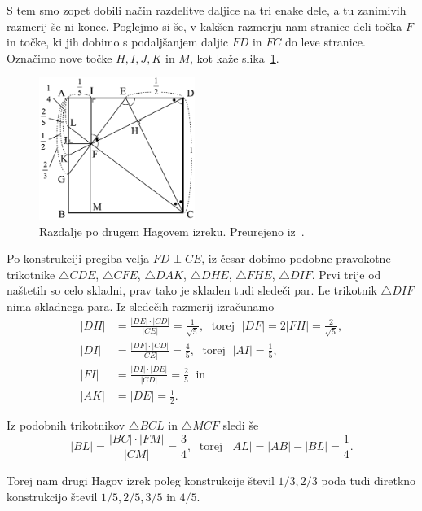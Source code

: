 S tem smo zopet dobili način razdelitve daljice na tri enake dele, a tu zanimivih razmerij še ni konec. Poglejmo si še, v kakšen razmerju nam stranice deli točka $F$ in točke, ki jih dobimo s podaljšanjem daljic $FD$ in $FC$ do leve stranice. Označimo nove točke $H, I, J, K$ in $M$, kot kaže slika~\ref{fig:hagov_izrek2_st}.

\begin{figure}[h]
    \centering
    \includegraphics[width=0.45\textwidth]{images/hagovi_izreki/hagov_izrek2_stevilke.png}
    \caption[Drugi Hagov izrek v številkah]{Razdalje po drugem Hagovem izreku. Preurejeno iz~\cite[str. 15]{haga2008}.}
    \label{fig:hagov_izrek2_st}
\end{figure}

Po konstrukciji pregiba velja $FD \perp CE$, iz česar dobimo podobne pravokotne trikotnike $\triangle CDE$, $\triangle CFE$, $\triangle DAK$, $\triangle DHE$, $\triangle FHE$, $\triangle DIF$. Prvi trije od naštetih so celo skladni, prav tako je skladen tudi sledeči par. Le trikotnik $\triangle DIF$ nima skladnega para. Iz sledečih razmerij izračunamo
\begin{align*}
    |DH| &= \frac{|DE| \cdot |CD|}{|CE|} = \frac{1}{\sqrt{5}}, \; \text{ torej } \; |DF| = 2|FH| = \frac{2}{\sqrt{5}}, \\
    |DI| &= \frac{|DF| \cdot |CD|}{|CE|} = \frac{4}{5}, \; \text{ torej } \; |AI| = \frac{1}{5}, \\
    |FI| &= \frac{|DI| \cdot |DE|}{|CD|} = \frac{2}{5} \; \text{ in} \\
    |AK| &= |DE| = \frac{1}{2}.
\end{align*}

Iz podobnih trikotnikov $\triangle BCL$ in $\triangle MCF$ sledi še
$$ |BL| = \frac{|BC| \cdot |FM|}{|CM|} = \frac{3}{4}, \; \text{ torej } \; |AL| = |AB| - |BL| = \frac{1}{4}. $$

Torej nam drugi Hagov izrek poleg konstrukcije števil $1/3, 2/3$ poda tudi diretkno konstrukcijo števil $1/5, 2/5, 3/5$ in $4/5$.

